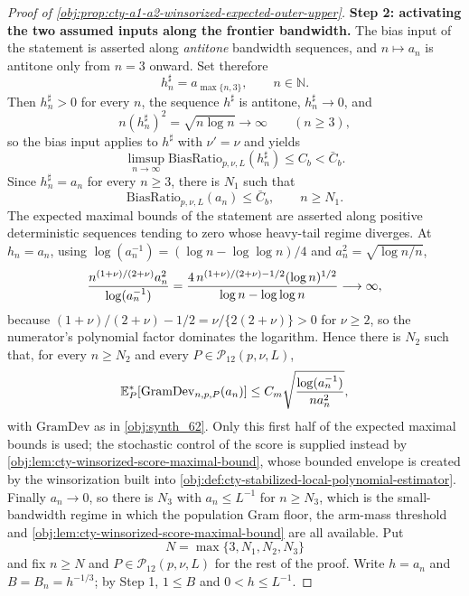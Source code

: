 \documentclass[11pt]{article}
\begin{document}
\begin{proof}[Proof of \cref{obj:prop:cty-a1-a2-winsorized-expected-outer-upper}]
\textbf{Step 2: activating the two assumed inputs along the frontier bandwidth.}  The bias input of the statement is asserted along \emph{antitone} bandwidth sequences, and \(n\mapsto a_n\) is antitone only from \(n=3\) onward.  Set therefore
\[
h^\sharp_n=a_{\max\{n,3\}},
\qquad n\in\mathbb N .
\]
Then \(h^\sharp_n>0\) for every \(n\), the sequence \(h^\sharp\) is antitone, \(h^\sharp_n\to0\), and
\[
n(h^\sharp_n)^2=\sqrt{n\log n}\to\infty
\qquad(n\geq3),
\]
so the bias input applies to \(h^\sharp\) with \(\nu'=\nu\) and yields
\[
\limsup_{n\to\infty}\mathrm{BiasRatio}_{p,\nu,L}(h^\sharp_n)\leq C_b<\bar C_b .
\]
Since \(h^\sharp_n=a_n\) for every \(n\geq3\), there is \(N_1\) such that
\[
\mathrm{BiasRatio}_{p,\nu,L}(a_n)\leq\bar C_b,
\qquad n\geq N_1 .
\]
The expected maximal bounds of the statement are asserted along positive deterministic sequences tending to zero whose heavy-tail regime diverges.  At \(h_n=a_n\), using \(\log(a_n^{-1})=(\log n-\log\log n)/4\) and \(a_n^2=\sqrt{\log n/n}\),
\[
{n^{(1+\nu)/(2+\nu)}a_n^2\over\log(a_n^{-1})}
=
{4\,n^{(1+\nu)/(2+\nu)-1/2}(\log n)^{1/2}\over\log n-\log\log n}
\longrightarrow\infty,
\]
because \((1+\nu)/(2+\nu)-1/2=\nu/\{2(2+\nu)\}>0\) for \(\nu\geq2\), so the numerator's polynomial factor dominates the logarithm.  Hence there is \(N_2\) such that, for every \(n\geq N_2\) and every \(P\in\mathcal P_{12}(p,\nu,L)\),
\[
\mathbb E_P^*\!\left[\mathrm{GramDev}_{n,p,P}(a_n)\right]
\leq
C_m\sqrt{\log(a_n^{-1})\over na_n^2},
\]
with \(\mathrm{GramDev}\) as in \cref{obj:synth_62}.  Only this first half of the expected maximal bounds is used; the stochastic control of the score is supplied instead by \cref{obj:lem:cty-winsorized-score-maximal-bound}, whose bounded envelope is created by the winsorization built into \cref{obj:def:cty-stabilized-local-polynomial-estimator}.
Finally \(a_n\to0\), so there is \(N_3\) with \(a_n\leq L^{-1}\) for \(n\geq N_3\), which is the small-bandwidth regime in which the population Gram floor, the arm-mass threshold and \cref{obj:lem:cty-winsorized-score-maximal-bound} are all available.  Put
\[
N=\max\{3,N_1,N_2,N_3\}
\]
and fix \(n\geq N\) and \(P\in\mathcal P_{12}(p,\nu,L)\) for the rest of the proof.  Write \(h=a_n\) and \(B=B_n=h^{-1/3}\); by Step 1, \(1\leq B\) and \(0<h\leq L^{-1}\).


\end{proof}
\end{document}
